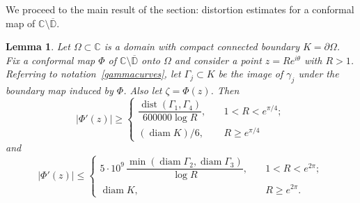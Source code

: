 \documentclass[11pt]{amsart}
\newtheorem{lemma}[theorem]{Lemma}
\theoremstyle{remark}
\numberwithin{equation}{section}
\newcommand{\C}{\mathbb{C}}
\newcommand{\DD}{\mathbb{D}}
\newcommand{\abs}[1]{\lvert#1\rvert}
\DeclareMathOperator{\dist}{dist}
\DeclareMathOperator{\diam}{diam}
\begin{document}
We proceed to the main result of the section: distortion estimates for a conformal map of $\C\setminus\overline{\DD}$. 

\begin{lemma}\label{extconf}
 Let $\Omega\subset \C$ is a domain with compact connected boundary  $K=\partial \Omega$. Fix a conformal map $\Phi $  of $\C\setminus\overline{\DD}$ onto $\Omega$ and consider a point $z = Re^{i\theta}$ with $R>1$. Referring to notation~\eqref{gammacurves}, let $\Gamma_j\subset K$ be the image of $\gamma_j$ under the boundary map induced by $\Phi$. Also let $\zeta = \Phi(z)$. Then 
\begin{equation}\label{extderest1}
\abs{\Phi'(z)} \ge  
\begin{cases}
\dfrac{\dist(\Gamma_1, \Gamma_4)}{600000\log R},\quad 
&1 < R < e^{\pi/4}; \\ 
(\diam K)/6 ,\quad & R \ge e^{\pi/4}
\end{cases}
\end{equation}
and
\begin{equation}\label{extderest2}
\abs{\Phi'(z)} \le 
\begin{cases}
5\cdot 10^9 \,\dfrac{\min(\diam \Gamma_2, \diam \Gamma_3)}{\log R},\quad & 1 < R < e^{2\pi}; \\ 
\diam K, \quad & R \ge e^{2\pi}.
\end{cases}
\end{equation}
\end{lemma}
\end{document}

